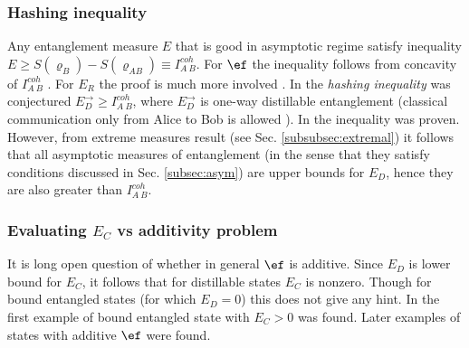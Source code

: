 \documentclass[twocolumn,aps,rmp]{revtex4}
\begin{document}
\subsubsection{Hashing inequality}
\label{subsec:hasineq}
Any entanglement measure $E$ that is good in asymptotic regime satisfy inequality $E\geq S(\varrho_B)-S(\varrho_{AB})\equiv I^{coh}_{A\>B}$. For $\ef$ the
inequality follows from concavity of $I^{coh}_{A\>B}$ \cite{termo}. For
$E_R$ the proof is much more involved \cite{PlenioVP2000}. In
\cite{HHH-cap2000} the {\it hashing inequality} was conjectured
$E_D^\to\geq I^{coh}_{A\>B}$, where $E_D^\to$ is one-way distillable
entanglement (classical communication only from Alice to Bob is
allowed \cite{BDSW1996}). In
\cite{DevetakWinter-hash,DevetakWinter-hash-prl} the inequality was
proven. However, from extreme measures result (see Sec.
\ref{subsubsec:extremal}) it follows that all asymptotic measures of
entanglement (in the sense that they satisfy conditions discussed
in Sec. \ref{subsec:asym}) are upper bounds  for $E_D$, hence they are also greater than $I^{coh}_{A\>B}$.






\subsubsection{Evaluating $E_C$ vs additivity problem}
\label{subsubsec:cost-addit} It is long open question of whether in
general $\ef$ is additive. Since $E_D$ is lower bound for $E_C$, it
follows that for distillable states $E_C$ is nonzero. Though for
bound entangled states (for which $E_D=0$) this does not give any
hint. In \cite{VidalC-irre} the first example of bound
entangled state with $E_C>0$ was found. Later \cite{Vidal-cost2002}
examples of states with additive $\ef$ were found.
\end{document}
